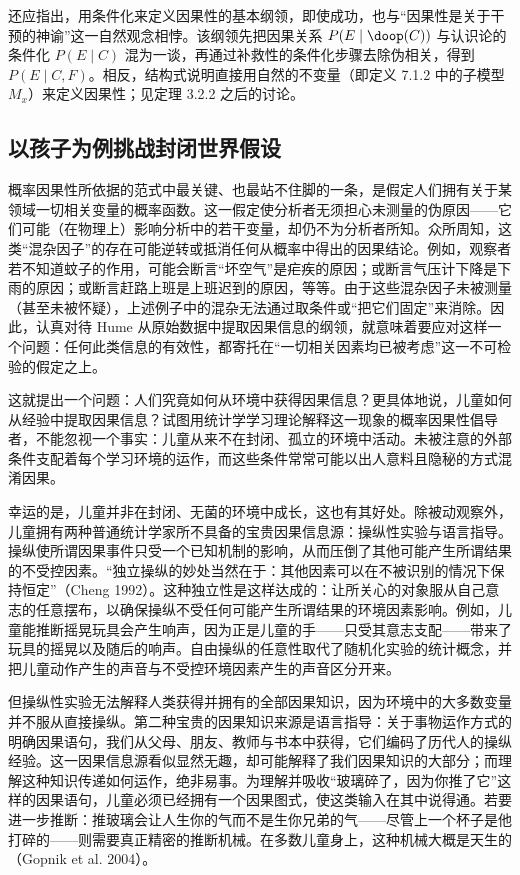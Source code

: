 还应指出，用条件化来定义因果性的基本纲领，即使成功，也与“因果性是关于干预的神谕”这一自然观念相悖。该纲领先把因果关系 $P(E\mid\doop(C))$ 与认识论的条件化 $P(E\mid C)$ 混为一谈，再通过补救性的条件化步骤去除伪相关，得到 $P(E\mid C,F)$。相反，结构式说明直接用自然的不变量（即定义 7.1.2 中的子模型 $M_x$）来定义因果性；见定理 3.2.2 之后的讨论。

\subsection{以孩子为例挑战封闭世界假设}

概率因果性所依据的范式中最关键、也最站不住脚的一条，是假定人们拥有关于某领域一切相关变量的概率函数。这一假定使分析者无须担心未测量的伪原因——它们可能（在物理上）影响分析中的若干变量，却仍不为分析者所知。众所周知，这类“混杂因子”的存在可能逆转或抵消任何从概率中得出的因果结论。例如，观察者若不知道蚊子的作用，可能会断言“坏空气”是疟疾的原因；或断言气压计下降是下雨的原因；或断言赶路上班是上班迟到的原因，等等。由于这些混杂因子未被测量（甚至未被怀疑），上述例子中的混杂无法通过取条件或“把它们固定”来消除。因此，认真对待 Hume 从原始数据中提取因果信息的纲领，就意味着要应对这样一个问题：任何此类信息的有效性，都寄托在“一切相关因素均已被考虑”这一不可检验的假定之上。

这就提出一个问题：人们究竟如何从环境中获得因果信息？更具体地说，儿童如何从经验中提取因果信息？试图用统计学学习理论解释这一现象的概率因果性倡导者，不能忽视一个事实：儿童从来不在封闭、孤立的环境中活动。未被注意的外部条件支配着每个学习环境的运作，而这些条件常常可能以出人意料且隐秘的方式混淆因果。

幸运的是，儿童并非在封闭、无菌的环境中成长，这也有其好处。除被动观察外，儿童拥有两种普通统计学家所不具备的宝贵因果信息源：操纵性实验与语言指导。操纵使所谓因果事件只受一个已知机制的影响，从而压倒了其他可能产生所谓结果的不受控因素。“独立操纵的妙处当然在于：其他因素可以在不被识别的情况下保持恒定”（Cheng 1992）。这种独立性是这样达成的：让所关心的对象服从自己意志的任意摆布，以确保操纵不受任何可能产生所谓结果的环境因素影响。例如，儿童能推断摇晃玩具会产生响声，因为正是儿童的手——只受其意志支配——带来了玩具的摇晃以及随后的响声。自由操纵的任意性取代了随机化实验的统计概念，并把儿童动作产生的声音与不受控环境因素产生的声音区分开来。

但操纵性实验无法解释人类获得并拥有的全部因果知识，因为环境中的大多数变量并不服从直接操纵。第二种宝贵的因果知识来源是语言指导：关于事物运作方式的明确因果语句，我们从父母、朋友、教师与书本中获得，它们编码了历代人的操纵经验。这一因果信息源看似显然无趣，却可能解释了我们因果知识的大部分；而理解这种知识传递如何运作，绝非易事。为理解并吸收“玻璃碎了，因为你推了它”这样的因果语句，儿童必须已经拥有一个因果图式，使这类输入在其中说得通。若要进一步推断：推玻璃会让人生你的气而不是生你兄弟的气——尽管上一个杯子是他打碎的——则需要真正精密的推断机械。在多数儿童身上，这种机械大概是天生的（Gopnik et al. 2004）。

